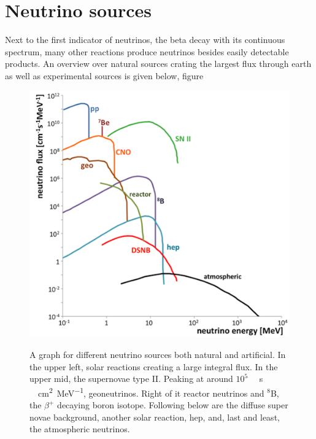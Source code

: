 	\section{Neutrino sources}
	\label{ch:Introduction:sec:neutrinoSources}
	Next to the first indicator of neutrinos, the beta decay with its continuous spectrum, many other reactions produce neutrinos besides easily detectable products. An overview over natural sources crating the largest flux through earth as well as experimental sources is given below, figure 
	\begin{figure}
		\begin{minipage}{0.65\textwidth}
			\includegraphics[width=\textwidth]{graphics/neutrinos/neutrinoSpectrum.png}
		\end{minipage}
		\begin{minipage}{0.34\textwidth}
		\caption[Neutrino sources]{~}A graph for different neutrino sources both natural and artificial. In the upper left, solar reactions creating a large integral flux. In the upper mid, the supernovae type II. Peaking at around $10^5$ \SI{}{\per\second} \SI{}{\per\square\centi\meter\per\mega\electronvolt}, geoneutrinos. Right of it reactor neutrinos and $^8$B, the $\beta^+$ decaying boron isotope. Following below are the diffuse super novae background, another solar reaction, hep, and, last and least, the atmospheric neutrinos.
		\label{fig:neutrinos:neutrinoSources}	
		\end{minipage}

		
	\end{figure}

